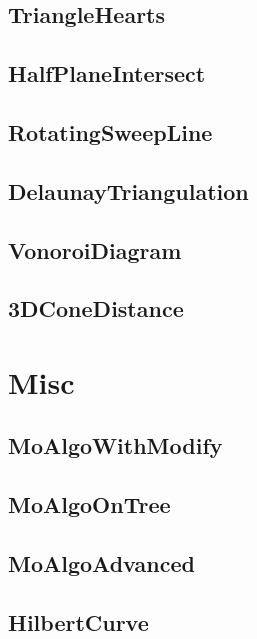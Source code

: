 	\subsection{TriangleHearts}
	
	\subsection{HalfPlaneIntersect}
	
	\subsection{RotatingSweepLine}
	
	\subsection{DelaunayTriangulation}
	
	\subsection{VonoroiDiagram}
	
	\subsection{3DConeDistance}
	
\section{Misc}
	\subsection{MoAlgoWithModify}
	
	\subsection{MoAlgoOnTree}
	
	\subsection{MoAlgoAdvanced}
	
	\subsection{HilbertCurve}
	
